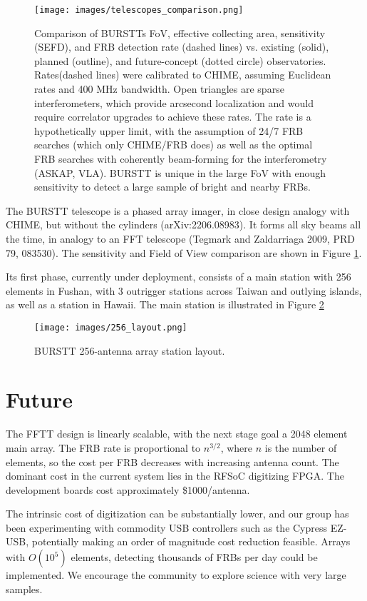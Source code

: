 \documentclass[fleqn,usenatbib]{mnras}
\begin{document}
\begin{figure}
\texttt{[image: images/telescopes\_comparison.png]}
\caption{Comparison of BURSTTs FoV, effective collecting area, sensitivity (SEFD), and FRB detection rate (dashed lines) vs. existing (solid), planned (outline), and future-concept (dotted circle) observatories. Rates(dashed lines) were calibrated to CHIME, assuming Euclidean rates and 400 MHz bandwidth. Open triangles are sparse interferometers, which provide arcsecond localization and would require correlator upgrades to achieve these rates. The rate is a hypothetically upper limit, with the assumption of 24/7 FRB searches (which only CHIME/FRB does) as well as the optimal FRB searches with coherently beam-forming for the interferometry (ASKAP, VLA).  BURSTT is unique in the large FoV with enough sensitivity to detect a large sample of bright and nearby FRBs. 
\label{fig:telescopes_comparison}}
\end{figure}

The BURSTT telescope is a phased array imager, in close design analogy with CHIME, but without the cylinders (arXiv:2206.08983).  It forms all sky beams all the time, in analogy to an FFT telescope (Tegmark and Zaldarriaga 2009, PRD 79, 083530). The sensitivity and Field of View comparison are shown in Figure \ref{fig:telescopes_comparison}.


Its first phase, currently under deployment, consists of a main station with 256 elements in Fushan, with 3 outrigger stations across Taiwan and outlying islands, as well as a station in Hawaii.  The main station is illustrated in Figure \ref{fig:256_layout}

\begin{figure}
\texttt{[image: images/256\_layout.png]}
\caption{BURSTT 256-antenna array station layout. 
\label{fig:256_layout}}
\end{figure}

\section{Future}

The FFTT design is linearly scalable, with the next stage goal a 2048 element main array.  The FRB rate is proportional to $n^{3/2}$, where $n$ is the number of elements, so the cost per FRB decreases with increasing antenna count.  The dominant cost in the current system lies in the RFSoC digitizing FPGA.  The development boards cost approximately \$1000/antenna.

The intrinsic cost of digitization can be substantially lower, and our group has been experimenting with commodity USB controllers such as the Cypress EZ-USB, potentially making an order of magnitude cost reduction feasible.   Arrays with $O(10^5)$ elements, detecting thousands of FRBs per day could be implemented.  We encourage the community to explore science with very large samples.

\bsp    %
\label{lastpage}
\end{document}
